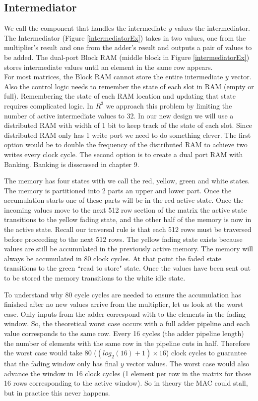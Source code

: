 \subsection{Intermediator}
\label{sec:intermediator}
We call the component that handles the intermediate $y$ values the intermediator. The Intermediator (Figure \ref{intermediatorEx}) takes in two values, one from the multiplier's result and one from the adder's result and outputs a pair of values to be added. The dual-port Block RAM (middle block in Figure \ref{intermediatorEx}) stores intermediate values until an element in the same row appears. 
\\\indent
For most matrices, the Block RAM cannot store the entire intermediate $y$ vector. Also the control logic needs to remember the state of each slot in RAM (empty or full). Remembering the state of each RAM location and updating that state requires complicated logic. In $R^3$ we approach this problem by limiting the number of active intermediate values to 32. In our new design we will use a distributed RAM with width of 1 bit to keep track of the state of each slot. Since distributed RAM only has 1 write port we need to do something clever. The first option would be to double the frequency of the distributed RAM to achieve two writes every clock cycle. The second option is to create a dual port RAM with Banking. Banking is disscussed in chapter 9.
\par The memory has four states with we call the red, yellow, green and white states. The memory is partitioned into 2 parts an upper and lower part. Once the accumulation starts one of these parts will be in the red active state. Once the incoming values move to the next 512 row section of the matrix the active state transitions to the yellow fading state, and the other half of the memory is now in the active state. Recall our traversal rule is that each 512 rows must be traversed before proceeding to the next 512 rows. The yellow fading state exists because values are still be accumulated in the previously active memory. The memory will always be accumulated in 80 clock cycles. At that point the faded state transitions to the green ``read to store" state. Once the values have been sent out to be stored the memory transitions to the white idle state.
\par To understand why 80 cycle cycles are needed to ensure the accumulation has finished after no new values arrive from the multiplier, let us look at the worst case. Only inputs from the adder correspond with to the elements in the fading window. So, the theoretical worst case occurs with a full adder pipeline and each value corresponds to the same row. Every 16 cycles (the adder pipeline length) the number of elements with the same row in the pipeline cuts in half. Therefore the worst case would take 80 ($(log_2(16) + 1) \times 16$) clock cycles to guarantee that the fading window only has final $y$ vector values. The worst case would also advance the window in 16 clock cycles (1 element per row in the matrix for those 16 rows corresponding to the active window). So in theory the MAC could stall, but in practice this never happens.
